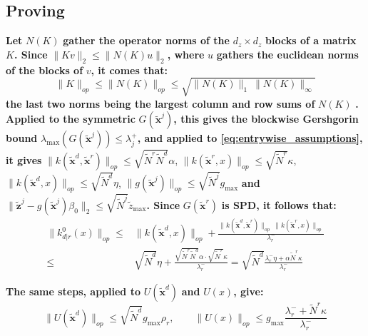 \documentclass[preprint]{elsarticle}
\begin{document}
\subsection[]{Proving }\label{sec:entrywise_proof}

\textbf{Let} $N(K)$ \textbf{gather the operator norms of the} $d_z\times d_z$ \textbf{blocks of a matrix} $K$\textbf{. Since} $\|Kv\|_2\leq\|N(K)u\|_2$\textbf{, where} $u$ \textbf{gathers the euclidean norms of the blocks of} $v$\textbf{, it comes that:}
\begin{equation*}
    \|K\|_{op}\leq\|N(K)\|_{op}\leq\sqrt{\|N(K)\|_1\:\|N(K)\|_\infty}
\end{equation*}
\textbf{the last two norms being the largest column and row sums of} $N(K)$ \textbf{\cite{bib:matrix-analysis}. Applied to the symmetric} $G(\tilde{\mathbf{x}}^j)$\textbf{, this gives the blockwise Gershgorin bound} $\lambda_{\max}(G(\tilde{\mathbf{x}}^j))\leq\lambda_j^+$\textbf{, and applied to \eqref{eq:entrywise_assumptions}, it gives} $\|k(\tilde{\mathbf{x}}^d,\tilde{\mathbf{x}}^r)\|_{op}\leq\sqrt{\tilde{N}^r\tilde{N}^d}\alpha$, $\|k(\tilde{\mathbf{x}}^r,x)\|_{op}\leq\sqrt{\tilde{N}^r}\kappa$, $\|k(\tilde{\mathbf{x}}^d,x)\|_{op}\leq\sqrt{\tilde{N}^d}\eta$, $\|g(\tilde{\mathbf{x}}^j)\|_{op}\leq\sqrt{\tilde{N}^j}g_{\max}$ \textbf{and} $\|\tilde{\mathbf{z}}^j-g(\tilde{\mathbf{x}}^j)\beta_0\|_2\leq\sqrt{\tilde{N}^j}\tilde{z}_{\max}$\textbf{. Since} $G(\tilde{\mathbf{x}}^r)$ \textbf{is SPD, it follows that:}
\begin{equation*}
    \begin{aligned}
    \|k^0_{d|r}(x)\|_{op}\leq&\|k(\tilde{\mathbf{x}}^d,x)\|_{op}+\frac{\|k(\tilde{\mathbf{x}}^d,\tilde{\mathbf{x}}^r)\|_{op}\:\|k(\tilde{\mathbf{x}}^r,x)\|_{op}}{\lambda_r^-}\\
    \leq&\sqrt{\tilde{N}^d}\eta+\frac{\sqrt{\tilde{N}^r\tilde{N}^d}\alpha\cdot\sqrt{\tilde{N}^r}\kappa}{\lambda_r^-}=\sqrt{\tilde{N}^d}\frac{\lambda_r^-\eta+\alpha\tilde{N}^r\kappa}{\lambda_r^-}
    \end{aligned}
\end{equation*}

\textbf{The same steps, applied to} $U(\tilde{\mathbf{x}}^d)$ \textbf{and} $U(x)$\textbf{, give:}
\begin{equation*}
    \|U(\tilde{\mathbf{x}}^d)\|_{op}\leq\sqrt{\tilde{N}^d}g_{\max}\rho_r,\qquad\|U(x)\|_{op}\leq g_{\max}\frac{\lambda_r^-+\tilde{N}^r\kappa}{\lambda_r^-}
\end{equation*}
\end{document}
